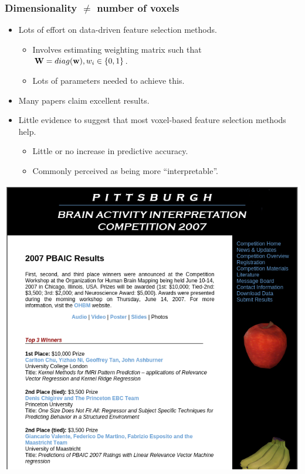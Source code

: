 \begin{frame}
\frametitle{Dimensionality $\ne$ number of voxels}
\begin{itemize}
\item Lots of effort on data-driven feature selection methods.
\begin{itemize}
\item Involves estimating weighting matrix such that\\
      ${\bf W} = diag({\bf w}), w_i \in \{0,1\}$.
\item Lots of parameters needed to achieve this.
\end{itemize}
\item Many papers claim excellent results.
\item Little evidence to suggest that most voxel-based feature selection methods help.
\begin{itemize}
\item Little or no increase in predictive accuracy.
\item Commonly perceived as being more ``interpretable''.
\end{itemize}
\end{itemize}
\end{frame}

\begin{frame}
\begin{center}
\includegraphics[height=0.7\textwidth]{pbaic2007}
\end{center}
\end{frame}

